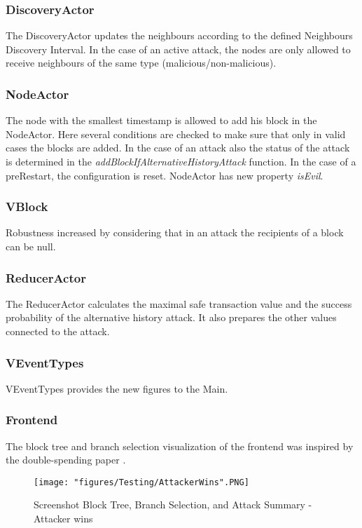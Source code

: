 \subsubsection{DiscoveryActor}
The DiscoveryActor updates the neighbours according to the defined Neighbours Discovery Interval. In the case of an active attack, the nodes are only allowed to receive neighbours of the same type (malicious/non-malicious).

\subsubsection{NodeActor}
The node with the smallest timestamp is allowed to add his block in the NodeActor. Here several conditions are checked to make sure that only in valid cases the blocks are added. In the case of an attack also the status of the attack is determined in the \textit{addBlockIfAlternativeHistoryAttack} function.
In the case of a preRestart, the configuration is reset.
NodeActor has new property \textit{isEvil}.

\subsubsection{VBlock}
Robustness increased by considering that in an attack the recipients of a block can be null.

\subsubsection{ReducerActor}
The ReducerActor calculates the maximal safe transaction value and the success probability of the alternative history attack. It also prepares the other values connected to the attack.

\subsubsection{VEventTypes}
VEventTypes provides the new figures to the Main.

\subsubsection{Frontend}
The block tree and branch selection visualization of the frontend was inspired by the double-spending paper \cite{doublespending}.

\begin{figure}[!htb]
\centering
\texttt{[image: "figures/Testing/AttackerWins".PNG]}
\caption{Screenshot Block Tree, Branch Selection, and Attack Summary - Attacker wins
\label{fig:AttackerWins}}
\end{figure}

